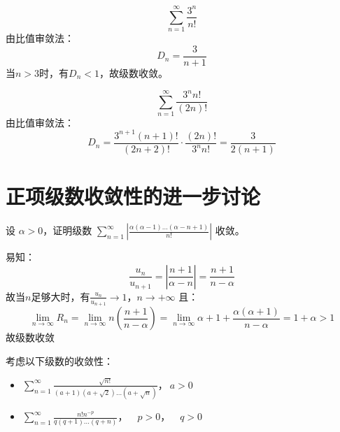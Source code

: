 \[
    \sum_{n=1}^{\infty} \frac{3^n}{n!}
\]
由比值审敛法：
\[
    D_{n} = \frac{3}{n+1}
\]
当\(n>3\)时，有\(D_{n} < 1\)，故级数收敛。

\[
    \sum_{n=1}^{\infty} \frac{3^{n}n!}{(2n)!}
\]
由比值审敛法：
\[
    D_{n} = \frac{3^{n+1}(n+1)!}{(2n+2)!} \cdot \frac{(2n)!}{3^{n}n!}
    = \frac{3}{2(n+1)}
\]

\section{正项级数收敛性的进一步讨论}

\begin{problem}
    设 \(\alpha > 0\)，证明级数 \(\sum_{n=1}^{\infty} \left|
        \frac{\alpha(\alpha - 1) \dots (\alpha - n + 1)}{n!}
    \right| \) 收敛。
\end{problem}

\begin{solution}
    易知： \[
        \frac{u_{n}}{u_{n+1}}= \left| \frac{n+1}{\alpha-n} \right| =
        \frac{n+1}{n-\alpha}
    \]
    故当\(n\)足够大时，有\(\frac{u_{n}}{u_{n+1}}\to 1\)，\(n \to +\infty\)
    且：
    \[
        \lim_{n \to \infty} R_{n} = \lim_{n \to \infty} n \left(
        \frac{n+1}{n-\alpha} \right)
        =\lim_{n \to \infty} \alpha +1 +
        \frac{\alpha(\alpha+1)}{n-\alpha} = 1+\alpha > 1
    \]
    故级数收敛
\end{solution}

\begin{problem}
    考虑以下级数的收敛性：
    \begin{itemize}
        \item \(\sum_{n=1}^{\infty}
                \frac{\sqrt{n!}}{(a+1)(a+\sqrt{2}) \dots
            (a+\sqrt{n})}，\ a > 0\)
        \item \(\sum_{n=1}^{\infty} \frac{n!n^{-p}}{q(q+1)
            \dots (q+n)}，            \quad p > 0，\quad q > 0\)
    \end{itemize}
\end{problem}

